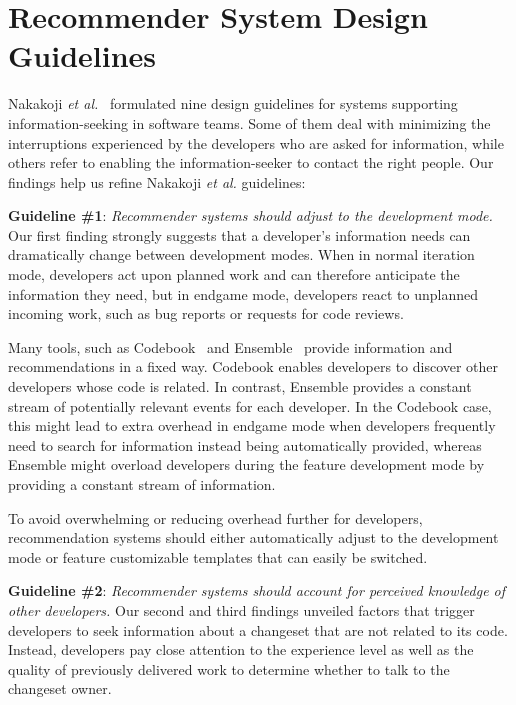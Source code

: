 \section{Recommender System Design Guidelines}
\label{sec:sub:tools}
Nakakoji \emph{et al.}~\cite{nakakoji2010:rdc} formulated nine design guidelines for systems supporting information-seeking in software teams. Some of them deal with minimizing the interruptions experienced by the developers who are asked for information, while others refer to enabling the information-seeker to contact the right people. Our findings help us refine Nakakoji \emph{et al.} guidelines:


\textbf{Guideline \#1}: \emph{Recommender systems should adjust to the development mode.}
Our first finding strongly suggests that a developer's information needs can dramatically change between development modes. 
%
When in normal iteration mode, developers act upon planned work and can therefore anticipate the information they need, but in endgame mode, developers react to unplanned incoming work, such as bug reports or requests for code reviews. 

Many tools, such as Codebook~\cite{begel:icse:2010} and Ensemble~\cite{xiang:rsse:2008} provide information and recommendations in a fixed way. 
Codebook enables developers to discover other developers whose code is related.
In contrast,  Ensemble provides a constant stream of potentially relevant events for each developer.
In the Codebook case, this might lead to extra overhead in endgame mode when developers frequently need to search for information instead being automatically provided, whereas Ensemble might overload developers during the feature development mode by providing a constant stream of information.

To avoid overwhelming or reducing overhead further for developers, recommendation systems should either automatically adjust to the development mode or feature customizable templates that can easily be switched. 


\textbf{Guideline \#2}: \emph{Recommender systems should account for perceived knowledge of other developers.}
Our second and third findings unveiled factors that trigger developers to seek information about a changeset that are not related to its code. 
Instead, developers pay close attention to the experience level as well as the quality of previously delivered work to determine whether to talk to the changeset owner.

